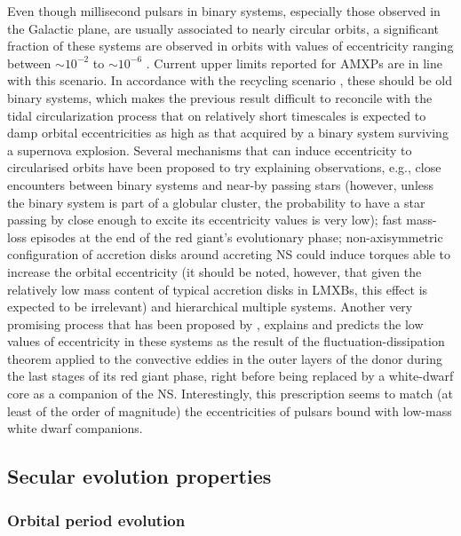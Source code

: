 \documentclass[fleqn,usenatbib]{mnras}
\begin{document}
Even though millisecond pulsars in binary systems, especially those observed in the Galactic plane, are usually associated to nearly circular orbits, a significant fraction of these systems are observed in orbits with values of eccentricity ranging between $\sim 10^{-2}$ to $\sim 10^{-6}$ \citep[roughly 60\% of the binary millisecond pulsars reported in the \textit{ATNF} catalog meet this condition;][]{Manchester:2005tg}. Current upper limits reported for AMXPs are in line with this scenario. In accordance with the recycling scenario \citep[see e.g.,][]{Bhattacharya91}, these should be old binary systems, which makes the previous result difficult to reconcile with the tidal circularization process that on relatively short timescales is expected to damp orbital eccentricities as high as that acquired by a binary system surviving a supernova explosion. Several mechanisms that can induce eccentricity to circularised orbits have been proposed to try explaining observations, e.g., close encounters between binary systems and near-by passing stars (however, unless the binary system is part of a globular cluster, the probability to have a star passing by close enough to excite its eccentricity values is very low); fast mass-loss episodes at the end of the red giant's evolutionary phase; non-axisymmetric configuration of accretion disks around accreting NS could induce torques able to increase the orbital eccentricity (it should be noted, however, that given the relatively low mass content of typical accretion disks in LMXBs, this effect is expected to be irrelevant) and hierarchical multiple systems. Another very promising process that has been proposed by \citet{Phinney:1992ty}, explains and predicts the low values of eccentricity in these systems as the result of the fluctuation-dissipation theorem applied to the convective eddies in the outer layers of the donor during the last stages of its red giant phase, right before being replaced by a white-dwarf core as a companion of the NS. Interestingly, this prescription seems to match (at least of the order of magnitude) the eccentricities of pulsars bound with low-mass white dwarf companions. 

\subsection{Secular evolution properties}

\subsubsection{Orbital period evolution} 
\label{sec:orb}
\end{document}
